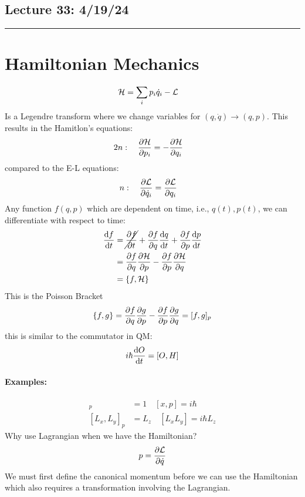 \documentclass[../main.tex]{subfiles}
\begin{document}
\subsection*{Lecture 33: \hfill  4/19/24}
\hrule \vspace{10px}
\section{Hamiltonian Mechanics}
\begin{align*}
    \mathcal{H} &= \sum_{i} p_i \dot q_i - \mathcal{L} 
\end{align*}
Is a Legendre transform where we change variables for $(q, \dot q) \to (q, p)$. This results in the
Hamitlon's equations:
\begin{align*}
    2n: \quad \pdv{\mathcal{H}}{p_i} &= - \pdv{\mathcal{H}}{q_i}
\end{align*}
compared to the E-L equations:
\begin{align*}
    n: \quad \pdv{\mathcal{L}}{\dot q_i} &= \pdv{\mathcal{L}}{q_i}
\end{align*}
Any function $f(q, p)$ which are dependent on time, i.e., $q(t), p(t)$, we can differentiate with
respect to time:
\begin{align*}
    \dv{f}{t} &= \cancel{\pdv{f}{t}} + \pdv{f}{q} \dv{q}{t} + \pdv{f}{p} \dv{p}{t} \\
    &= \pdv{f}{q} \pdv{\mathcal{H}}{p} - \pdv{f}{p} \pdv{\mathcal{H}}{q} \\
    &= \{f, \mathcal{H}\}
\end{align*}
This is the Poisson Bracket
\begin{align*}
    \{f, g\} = \pdv{f}{q} \pdv{g}{p} - \pdv{f}{p} \pdv{g}{q} = [f, g]_p
\end{align*}
this is similar to the commutator in QM:
\begin{align*}
    i\hbar \dv{O}{t} = [O, H] 
\end{align*}
\paragraph*{Examples:}
\begin{align*}
    [q, p]_p &= 1 \quad [x, p] = i\hbar  \\
    [L_x, L_y]_p &= L_z \quad [L_x L_y] = i\hbar L_z
\end{align*}
Why use Lagrangian when we have the Hamiltonian?
\begin{align*}
    p = \pdv{\mathcal{L}}{\dot q}
\end{align*}
We must first define the canonical momentum before we can use the Hamiltonian which also requires a
transformation involving the Lagrangian. 
\end{document}
